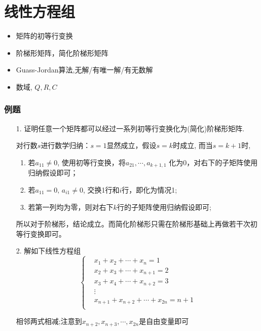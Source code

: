 \chapter{线性方程组}
\begin{itemize}
    \item 矩阵的初等行变换
    \item 阶梯形矩阵，简化阶梯形矩阵
    \item Guass-Jordan算法,无解/有唯一解/有无数解
    \item 数域, $Q,R,C$
\end{itemize}

\subsection*{例题}
\begin{itemize}
    \item[1.] 证明任意一个矩阵都可以经过一系列初等行变换化为(简化)阶梯形矩阵.
	\begin{solution}
	对行数$s$进行数学归纳：$s=1$显然成立，假设$s=k$时成立, 而当$s=k+1$时,
	\begin{enumerate}
		\item 若$a_{11} \ne 0$, 使用初等行变换，将$a_{21}, \cdots, a_{k+1,1}$
	化为0，对右下的子矩阵使用归纳假设即可；
		\item 若$a_{11} = 0, \,a_{i1} \ne 0$, 交换1行和$i$行，即化为情况1;
		\item 若第一列均为零，则对右下$k$行的子矩阵使用归纳假设即可;
	\end{enumerate}
	所以对于阶梯形，结论成立。而简化阶梯形只需在阶梯形基础上再做若干次初等行变换即可。
	\end{solution}
    \vspace{2cm}

    \item[2.] 解如下线性方程组
    \begin{equation}
    \nonumber
        \left\{
        \begin{aligned}
            &x_1 + x_2 + \cdots + x_n = 1\\
            &x_2 + x_3 + \cdots + x_{n+1} = 2\\
            &x_3 + x_4 + \cdots + x_{n+2} = 3\\
            &\vdots\\
            &x_{n+1}+x_{n+2}+ \cdots + x_{2n} = n+1\\
        \end{aligned}
        \right.
    \end{equation} 
	\begin{solution}
	相邻两式相减;注意到$x_{n+2}, x_{n+3},\cdots,x_{2n}$是自由变量即可
	\end{solution}
    \vspace{2cm}


\end{itemize}
